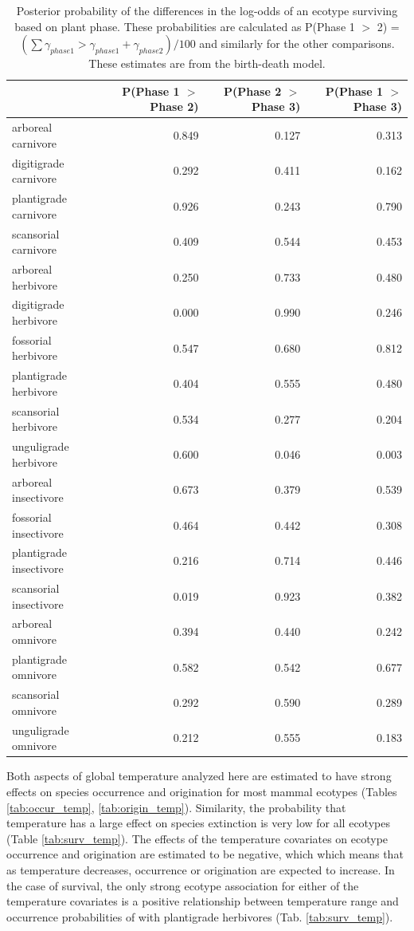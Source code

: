 \documentclass[12pt,letterpaper]{article}
\begin{document}
\begin{table}[ht]
  \centering
  \caption[Posterior probablity estimates of differences in survival by plant phase]{Posterior probability of the differences in the log-odds of an ecotype surviving based on plant phase. These probabilities are calculated as P(Phase 1 \(>\) 2) = \( (\sum \gamma_{phase 1} > \gamma_{phase 1} + \gamma_{phase 2}) / 100\) and similarly for the other comparisons. These estimates are from the birth-death model.}
  \label{tab:surv_plant}
  \begin{tabular}{ l r r r }
    \hline
    & P(Phase 1 $>$ Phase 2) & P(Phase 2 $>$ Phase 3) & P(Phase 1 $>$ Phase 3) \\ 
    \hline
    arboreal carnivore & 0.849 & 0.127 & 0.313 \\ 
    digitigrade carnivore & 0.292 & 0.411 & 0.162 \\ 
    plantigrade carnivore & 0.926 & 0.243 & 0.790 \\ 
    scansorial carnivore & 0.409 & 0.544 & 0.453 \\ 
    arboreal herbivore & 0.250 & 0.733 & 0.480 \\ 
    digitigrade herbivore & 0.000 & 0.990 & 0.246 \\ 
    fossorial herbivore & 0.547 & 0.680 & 0.812 \\ 
    plantigrade herbivore & 0.404 & 0.555 & 0.480 \\ 
    scansorial herbivore & 0.534 & 0.277 & 0.204 \\ 
    unguligrade herbivore & 0.600 & 0.046 & 0.003 \\ 
    arboreal insectivore & 0.673 & 0.379 & 0.539 \\ 
    fossorial insectivore & 0.464 & 0.442 & 0.308 \\ 
    plantigrade insectivore & 0.216 & 0.714 & 0.446 \\ 
    scansorial insectivore & 0.019 & 0.923 & 0.382 \\ 
    arboreal omnivore & 0.394 & 0.440 & 0.242 \\ 
    plantigrade omnivore & 0.582 & 0.542 & 0.677 \\ 
    scansorial omnivore & 0.292 & 0.590 & 0.289 \\ 
    unguligrade omnivore & 0.212 & 0.555 & 0.183 \\ 
    \hline
  \end{tabular}
\end{table}


Both aspects of global temperature analyzed here are estimated to have strong effects on species occurrence and origination for most mammal ecotypes (Tables \ref{tab:occur_temp}, \ref{tab:origin_temp}). Similarity, the probability that temperature has a large effect on species extinction is very low for all ecotypes (Table \ref{tab:surv_temp}). The effects of the temperature covariates on ecotype occurrence and origination are estimated to be negative, which which means that as temperature decreases, occurrence or origination are expected to increase. In the case of survival, the only strong ecotype association for either of the temperature covariates is a positive relationship between temperature range and occurrence probabilities of with plantigrade herbivores (Tab. \ref{tab:surv_temp}).
\end{document}
